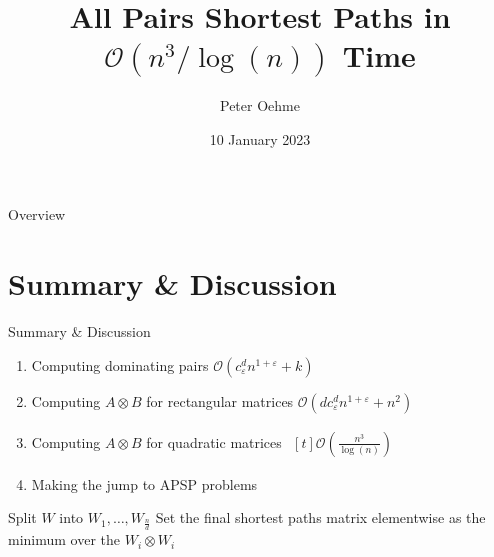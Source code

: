 

\author{Peter Oehme}
\title{All Pairs Shortest Paths in \texorpdfstring{$\mathcal{O}(n^3 / \log(n))$}{O (n \^{} 3 / log (n))} Time}
\date{10 January 2023}




\begin{frame}
    \maketitle
\end{frame}

\begin{frame}{Overview}
    \tableofcontents
\end{frame}







\section*{Summary \& Discussion}

\begin{frame}{Summary \& Discussion}
    \begin{enumerate}
        \item Computing dominating pairs $\mathcal{O}\left( c_\varepsilon^d n^{1 + \varepsilon} + k \right)$
        \item Computing $A \otimes B$ for rectangular matrices $\mathcal{O}\left( d c_\varepsilon^d n^{1 + \varepsilon} + n^2 \right)$
        \item Computing $A \otimes B$ for quadratic matrices $\begin{aligned}[t]\mathcal{O}\left( \frac{n^3}{\log(n)} \right)\end{aligned}$
        \item Making the jump to APSP problems
    \end{enumerate}

    \begin{algorithm}[H]
        Split $W$ into $W_1, \dots, W_{\frac{n}{d}}$\;
        Set the final shortest paths matrix elementwise as the minimum over the $W_i \otimes W_i$\;
    \end{algorithm}
\end{frame}



